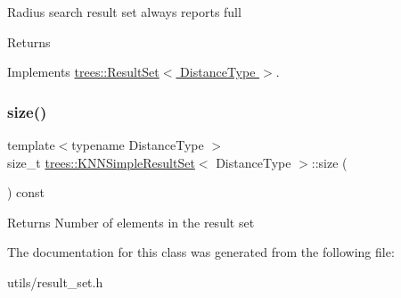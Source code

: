 Radius search result set always reports full \begin{DoxyReturn}{Returns}

\end{DoxyReturn}


Implements \hyperlink{classtrees_1_1_result_set}{trees\+::\+Result\+Set$<$ Distance\+Type $>$}.

\mbox{\label{classtrees_1_1_k_n_n_simple_result_set_a293139927910543164fa430ffdf91311}} 
\subsubsection{\texorpdfstring{size()}{size()}}
{\footnotesize\ttfamily template$<$typename Distance\+Type $>$ \\
size\+\_\+t \hyperlink{classtrees_1_1_k_n_n_simple_result_set}{trees\+::\+K\+N\+N\+Simple\+Result\+Set}$<$ Distance\+Type $>$\+::size (\begin{DoxyParamCaption}{ }\end{DoxyParamCaption}) const\hspace{0.3cm}{\ttfamily [inline]}}

\begin{DoxyReturn}{Returns}
Number of elements in the result set 
\end{DoxyReturn}


The documentation for this class was generated from the following file\+:\begin{DoxyCompactItemize}
\item 
utils/result\+\_\+set.\+h\end{DoxyCompactItemize}
